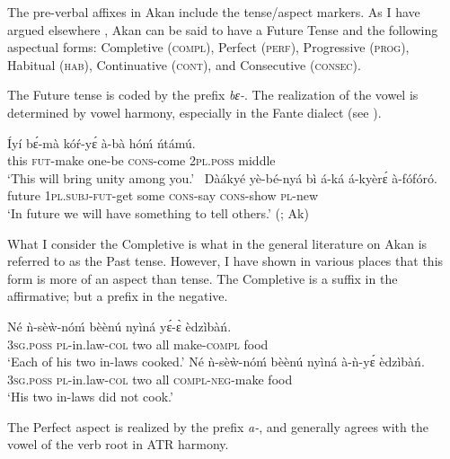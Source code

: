 \documentclass[output=paper]{langsci/langscibook}
\begin{document}
The pre-verbal affixes in Akan include the tense/aspect markers. As I have argued elsewhere \citep{osam1994a,osam2008b}, Akan can be said to have a Future Tense and the following aspectual forms: Completive (\textsc{compl}), Perfect (\textsc{perf}), Progressive (\textsc{prog}), Habitual (\textsc{hab}), Continuative (\textsc{cont}), and Consecutive (\textsc{consec}).

The Future tense is coded by the prefix \textit{bɛ-}. The realization of the vowel is determined by vowel harmony, especially in the Fante dialect (see \citealt{dolphyne1988}).

\ea\label{ex:2.osam}
\ea\label{ex:2a.osam}
\gll   \'{I}yí  b\'{ɛ}-mà    kóŕ-y\'{ɛ}    à-bà    hóḿ    ńtámú.\\
      this  \textsc{fut}-make  one-be    \textsc{cons}-come  \textsc{2pl.poss}  middle\\
\glt `This will bring unity among you.' \citep[79]{krampah1970}
\ex\label{ex:2b.osam}
\gll \ Dàákyé yè-bé-nyá    bì  á-ká    á-kyèr\'{ɛ}    à-fófóró.  \\
       future   \textsc{1pl.subj}-\textsc{fut}-get  some  \textsc{cons}-say \textsc{cons}-show  \textsc{pl}-new\\
\glt    `In future we will have something to tell others.' (\citealt[34]{adi1973}; Ak)
\z
\z


What I consider the Completive is what in the general literature on Akan is referred to as the Past tense. However, I have shown in various places \citep{osam1994a,osam2004,osam2008a} that this form is more of an aspect than tense. The Completive is a suffix in the affirmative; but a prefix in the negative.  

\ea\label{ex:3.osam}
\ea\label{ex:3a.osam}
\gll  Né  ǹ-sèẁ-nóḿ    bèènú   nyìná  yɛ́-ɛ̀ èdzìbàń.\\
     \textsc{3sg}.\textsc{poss} \textsc{pl}-in.law-\textsc{col}  two   all  make-\textsc{compl}  food\\
\glt `Each of his two in-laws cooked.' \citep[57]{krampah1970}
\ex\label{ex:3b.osam}
\gll Né  ǹ-sèẁ-nóḿ    bèènú   nyìná  à-ǹ-yɛ́ èdzìbàń.\\
     \textsc{  3sg}.\textsc{poss} \textsc{pl}-in.law-\textsc{col}  two  all  \textsc{compl-neg}-make  food\\
\glt `His two in-laws did not cook.'
\z 
\z 

The Perfect aspect is realized by the prefix \textit{a-}, and generally agrees with the vowel of the verb root in ATR harmony.
\end{document}
